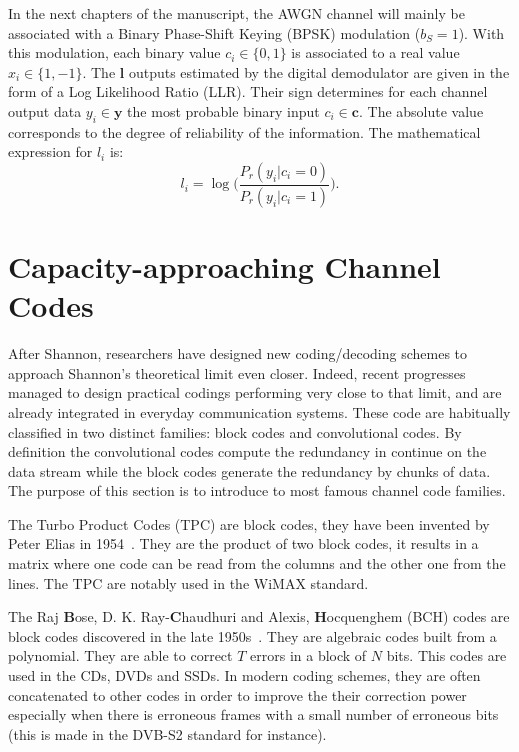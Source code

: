 In the next chapters of the manuscript, the AWGN channel will mainly be
associated with a Binary Phase-Shift Keying (BPSK) modulation ($b_S = 1$). With
this modulation, each binary value $c_i \in \{0,1\}$ is associated to a real
value $x_i \in \{1,-1\}.$ The $\bm{l}$ outputs estimated by the digital
demodulator are given in the form of a Log Likelihood Ratio (LLR). Their sign
determines for each channel output data $y_i \in \bm{y}$ the most probable
binary input $c_i \in \bm{c}$. The absolute value corresponds to the degree of
reliability of the information. The mathematical expression for $l_i$ is:
\begin{equation*}
l_i = \log{\Big(\frac{P_r(y_i|c_i = 0)}{P_r(y_i|c_i = 1)}\Big)}.
\end{equation*}

\section{Capacity-approaching Channel Codes}

After Shannon, researchers have designed new coding/decoding schemes to approach
Shannon's theoretical limit even closer. Indeed, recent progresses managed to
design practical codings performing very close to that limit, and are already
integrated in everyday communication systems. These code are habitually
classified in two distinct families: block codes and convolutional codes. By
definition the convolutional codes compute the redundancy in continue on the
data stream while the block codes generate the redundancy by chunks of data.
The purpose of this section is to introduce to most famous channel code
families.

The Turbo Product Codes (TPC) are block codes, they have been invented by Peter
Elias in 1954~\cite{Elias1954}. They are the product of two block codes, it
results in a matrix where one code can be read from the columns and the other
one from the lines. The TPC are notably used in the WiMAX standard.

The Raj \textbf{B}ose, D. K. Ray-\textbf{C}haudhuri and Alexis,
\textbf{H}ocquenghem (BCH) codes are block codes discovered in the late
1950s~\cite{Hocquenghem1959,Bose1960}. They are algebraic codes built from a
polynomial. They are able to correct $T$ errors in a block of $N$ bits. This
codes are used in the CDs, DVDs and SSDs. In modern coding schemes, they are
often concatenated to other codes in order to improve the their correction power
especially when there is erroneous frames with a small number of erroneous bits
(this is made in the DVB-S2 standard for instance).


